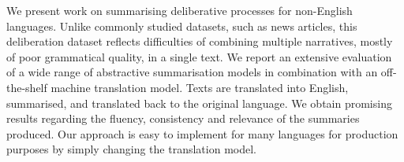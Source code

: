 We present work on summarising deliberative processes for non-English languages. Unlike commonly studied datasets, such as news articles, this deliberation dataset reflects difficulties of combining multiple narratives, mostly of poor grammatical quality, in a single text. We report an extensive evaluation of a wide range of abstractive summarisation models in combination with an off-the-shelf machine translation model. Texts are translated into English, summarised, and translated back to the original language. We obtain promising results regarding the fluency, consistency and relevance of the summaries produced. Our approach is easy to implement for many languages for production purposes by simply changing the translation model.
